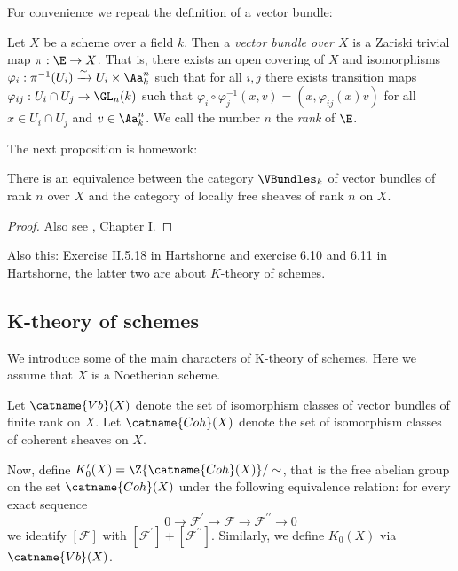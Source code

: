 \documentclass[11pt, english]{article}
\begin{document}
For convenience we repeat the definition of a vector bundle:
\begin{defi}
Let $X$ be a scheme over a field $k$. Then a \emph{vector bundle over $X$} is a Zariski trivial map $\pi:\E \to X$. That is, there exists an open covering of $X$ and isomorphisms $\varphi_i:\pi^{-1}(U_i) \xrightarrow{\simeq} U_i \times \Aa_k^n$ such that for all $i,j$ there exists transition maps $\varphi_{ij}:U_i \cap U_j \to \GL_n(k)$ such that $\varphi_i \circ \varphi_j^{-1}(x,v)=(x,\varphi_{ij}(x)v)$ for all $x \in U_i \cap U_j$ and $v \in \Aa_k^n$. We call the number $n$ the \emph{rank} of $\E$.
\end{defi}

The next proposition is homework:
\begin{prop}
There is an equivalence between the category $\VBundles_k$ of vector bundles of rank $n$ over $X$ and the category of locally free sheaves of rank $n$ on $X$.
\end{prop}
\begin{proof}
Also see \cite{neumann_stacks}, Chapter I. 
\end{proof}

Also this: Exercise II.5.18 in Hartshorne and exercise 6.10 and 6.11 in Hartshorne, the latter two are about $K$-theory of schemes.

\subsection{K-theory of schemes}

We introduce some of the main characters of K-theory of schemes. Here we assume that $X$ is a Noetherian scheme.

Let $\catname{Vb}(X)$ denote the set of isomorphism classes of vector bundles of finite rank on $X$. Let $\catname{Coh}(X)$ denote the set of isomorphism classes of coherent sheaves on $X$.

Now, define $K_0^\prime(X)=\Z\{ \catname{Coh}(X) \} / \sim$, that is the free abelian group on the set $\catname{Coh}(X)$ under the following equivalence relation: for every exact sequence
\[
0 \to \mathcal F ^\prime \to \mathcal F \to \mathcal F^{\prime \prime} \to 0
\]
we identify $[\mathcal F]$ with $[\mathcal F^\prime] + [\mathcal F^{\prime \prime}]$. Similarly, we define $K_0(X)$ via $\catname{Vb}(X)$.
\end{document}
